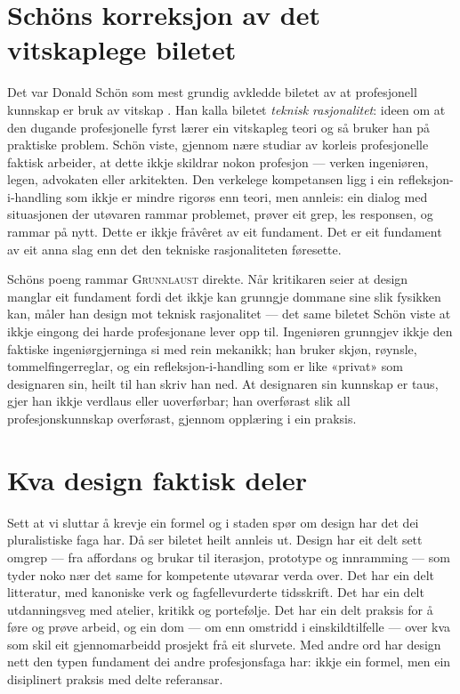 \section{Schöns korreksjon av det vitskaplege biletet}

Det var Donald Schön som mest grundig avkledde biletet av at profesjonell kunnskap er bruk av vitskap \autocite{schon1983}. Han kalla biletet \emph{teknisk rasjonalitet}: ideen om at den dugande profesjonelle fyrst lærer ein vitskapleg teori og så bruker han på praktiske problem. Schön viste, gjennom nære studiar av korleis profesjonelle faktisk arbeider, at dette ikkje skildrar nokon profesjon — verken ingeniøren, legen, advokaten eller arkitekten. Den verkelege kompetansen ligg i ein refleksjon-i-handling som ikkje er mindre rigorøs enn teori, men annleis: ein dialog med situasjonen der utøvaren rammar problemet, prøver eit grep, les responsen, og rammar på nytt. Dette er ikkje fråvêret av eit fundament. Det er eit fundament av eit anna slag enn det den tekniske rasjonaliteten føresette.

Schöns poeng rammar \textsc{Grunnlaust} direkte. Når kritikaren seier at design manglar eit fundament fordi det ikkje kan grunngje dommane sine slik fysikken kan, måler han design mot teknisk rasjonalitet — det same biletet Schön viste at ikkje eingong dei harde profesjonane lever opp til. Ingeniøren grunngjev ikkje den faktiske ingeniørgjerninga si med rein mekanikk; han bruker skjøn, røynsle, tommelfingerreglar, og ein refleksjon-i-handling som er like «privat» som designaren sin, heilt til han skriv han ned. At designaren sin kunnskap er taus, gjer han ikkje verdlaus eller uoverførbar; han overførast slik all profesjonskunnskap overførast, gjennom opplæring i ein praksis.

\section{Kva design faktisk deler}

Sett at vi sluttar å krevje ein formel og i staden spør om design har det dei pluralistiske faga har. Då ser biletet heilt annleis ut. Design har eit delt sett omgrep — fra affordans og brukar til iterasjon, prototype og innramming — som tyder noko nær det same for kompetente utøvarar verda over. Det har ein delt litteratur, med kanoniske verk og fagfellevurderte tidsskrift. Det har ein delt utdanningsveg med atelier, kritikk og portefølje. Det har ein delt praksis for å føre og prøve arbeid, og ein dom — om enn omstridd i einskildtilfelle — over kva som skil eit gjennomarbeidd prosjekt frå eit slurvete. Med andre ord har design nett den typen fundament dei andre profesjonsfaga har: ikkje ein formel, men ein disiplinert praksis med delte referansar.

